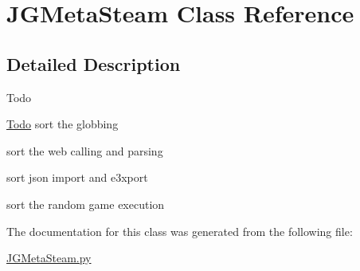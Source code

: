 \hypertarget{class_j_g_meta_steam}{\section{J\+G\+Meta\+Steam Class Reference}
\label{class_j_g_meta_steam}
}


\subsection{Detailed Description}
\begin{DoxyRefDesc}{Todo}
\item[\hyperlink{todo__todo000001}{Todo}]sort the globbing 

sort the web calling and parsing 

sort json import and e3xport 

sort the random game execution \end{DoxyRefDesc}


The documentation for this class was generated from the following file\+:\begin{DoxyCompactItemize}
\item 
\hyperlink{_j_g_meta_steam_8py}{J\+G\+Meta\+Steam.\+py}\end{DoxyCompactItemize}
